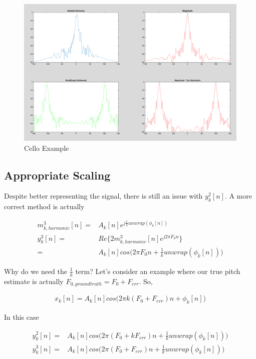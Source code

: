 \documentclass [11pt, proquest,oneside] {ganter_thesis}[2015/03/03]
\begin{document}
\begin{figure}[!ht]
  \centering
    \includegraphics[width=1\textwidth]{real_vs_magnitude_example}   
    \caption{Cello Example}
    \label{fig:real_vs_magnitude_example}
\end{figure}

\subsection{Appropriate Scaling}

Despite better representing the signal, there is still an issue with $y_k^2[n]$.  A more correct method is actually

\begin{align}
\label{eq:realVSmag3}
m^3_{k,harmonic}[n] =& A_k[n]e^{j\frac{1}{k} unwrap(\phi_k[n])} \\
y_k^3[n] =& Re\{ 2 m^3_{k,harmonic}[n] e^{j2\pi F_0 n} \}  \\
=& A_k[n]cos\Big(2\pi F_0 n + \frac{1}{k}unwrap(\phi_k[n])\Big) \nonumber
\end{align}


Why do we need the $\frac{1}{k}$ term?  Let's consider an example where our true pitch estimate is actually $F_{0,ground truth} = F_0 + F_{err}$.  So,

\begin{align}
x_k[n] = A_k[n]cos\Big(2\pi k(F_0 + F_{err})n + \phi_k[n]\Big)
\end{align}

In this case

\begin{align}
y_k^2[n] =& A_k[n]cos\Big(2\pi (F_0 + kF_{err})n + \frac{1}{k}unwrap(\phi_k[n])\Big) \\
y_k^3[n] =& A_k[n]cos\Big(2\pi (F_0 + F_{err})n + \frac{1}{k}unwrap(\phi_k[n])\Big)
\end{align}
\end{document}

